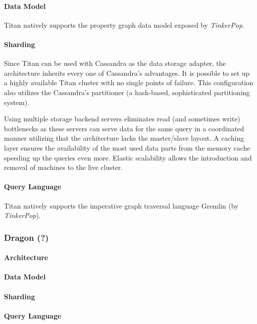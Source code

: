 \paragraph{Data Model}
Titan natively supports the property graph data model exposed by \emph{TinkerPop}.

\paragraph{Sharding}
Since Titan can be used with Cassandra as the data storage adapter, the architecture inherits every one of Cassandra's advantages. It is possible to set up a highly available Titan cluster with no single points of failure. This configuration also utilizes the Cassandra's partitioner (a hash-based, sophisticated partitioning system).

Using multiple storage backend servers eliminates read (and sometimes write) bottlenecks as these servers can serve data for the same query in a coordinated manner utilizing that the architecture lacks the master/slave layout. A caching layer ensures the availability of the most used data parts from the memory cache speeding up the queries even more. Elastic scalability allows the introduction and removal of machines to the live cluster.


\paragraph{Query Language}
Titan natively supports the imperative graph traversal language Gremlin (by \emph{TinkerPop}).


\subsubsection{Dragon (?)}
\paragraph{Architecture}
\paragraph{Data Model}
\paragraph{Sharding}
\paragraph{Query Language}


